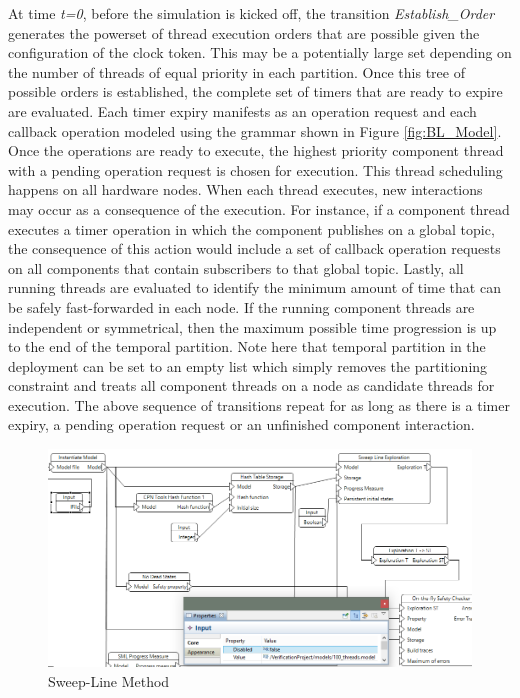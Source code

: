 At time \emph{t=0}, before the simulation is kicked off, the transition \emph{Establish\_Order} generates the powerset of thread execution orders that are possible given the configuration of the clock token. This may be a potentially large set depending on the number of threads of equal priority in each partition. Once this tree of possible orders is established, the complete set of timers that are ready to expire are evaluated. Each timer expiry manifests as an operation request and each callback operation modeled using the grammar shown in Figure \ref{fig:BL_Model}. Once the operations are ready to execute, the highest priority component thread with a pending operation request is chosen for execution. This thread scheduling happens on all hardware nodes. When each thread executes, new interactions may occur as a consequence of the execution. For instance, if a component thread executes a timer operation in which the component publishes on a global topic, the consequence of this action would include a set of callback operation requests on all components that contain subscribers to that global topic. Lastly, all running threads are evaluated to identify the minimum amount of time that can be safely fast-forwarded in each node. If the running component threads are independent or symmetrical, then the maximum possible time progression is up to the end of the temporal partition. Note here that temporal partition in the deployment can be set to an empty list which simply removes the  partitioning constraint and treats all component threads on a node as candidate threads for execution. The above sequence of transitions repeat for as long as there is a timer expiry, a pending operation request or an unfinished component interaction. 

\begin{figure}[h]
	\centering
	\includegraphics[width=\textwidth]{./img/sl}
	\caption{Sweep-Line Method}
	\label{fig:sl}
\end{figure}

